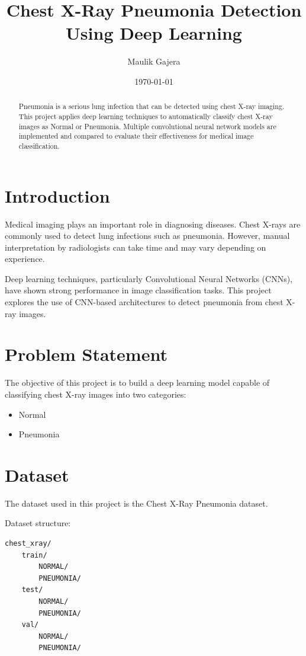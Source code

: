 \documentclass[12pt]{article}
\title{Chest X-Ray Pneumonia Detection Using Deep Learning}
\author{Maulik Gajera}
\date{\today}
\begin{document}
\maketitle

\begin{abstract}
Pneumonia is a serious lung infection that can be detected using chest X-ray imaging.
This project applies deep learning techniques to automatically classify chest X-ray
images as Normal or Pneumonia. Multiple convolutional neural network models are
implemented and compared to evaluate their effectiveness for medical image classification.
\end{abstract}

\section{Introduction}

Medical imaging plays an important role in diagnosing diseases. Chest X-rays are
commonly used to detect lung infections such as pneumonia. However, manual
interpretation by radiologists can take time and may vary depending on experience.

Deep learning techniques, particularly Convolutional Neural Networks (CNNs),
have shown strong performance in image classification tasks. This project
explores the use of CNN-based architectures to detect pneumonia from chest
X-ray images.

\section{Problem Statement}

The objective of this project is to build a deep learning model capable of
classifying chest X-ray images into two categories:

\begin{itemize}
\item Normal
\item Pneumonia
\end{itemize}

\section{Dataset}

The dataset used in this project is the Chest X-Ray Pneumonia dataset.

Dataset structure:

\begin{verbatim}
chest_xray/
    train/
        NORMAL/
        PNEUMONIA/
    test/
        NORMAL/
        PNEUMONIA/
    val/
        NORMAL/
        PNEUMONIA/
\end{verbatim}
\end{document}
